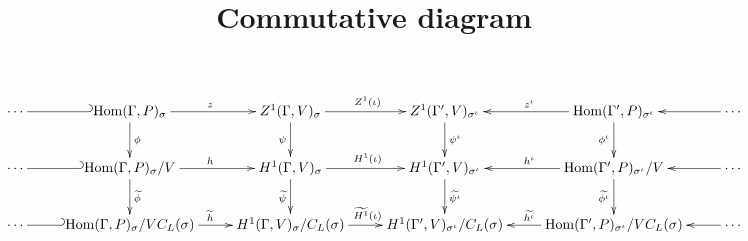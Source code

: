 \documentclass[12pt, a4paper]{amsart}
\newcommand{\Hom}[3]{\mathrm{Hom}(#1, #2)_{#3}}
\begin{document}
\title{Commutative diagram}
\maketitle
\begin{displaymath}
\xymatrix{
\cdots & \ar@{_{(}-}[l] \Hom{\Gamma}{P}{\sigma} \ar[d]^{\phi} \ar[r]^z & Z^1(\Gamma, V)_\sigma \ar[d]_{\psi} \ar[r]^{Z^1(\iota)} & Z^1(\Gamma', V)_{\sigma^\iota} \ar[d]^{\psi^\iota} & \Hom{\Gamma'}{P}{\sigma^\iota} \ar[l]_{z^\iota} \ar[d]_{\phi^\iota} & \cdots \ar@{->}[l] \\
\cdots & \ar@{_{(}-}[l] \Hom{\Gamma}{P}{\sigma}/V \ar[d]^{\widetilde{\phi}} \ar[r]^h & H^1(\Gamma, V)_\sigma \ar[d]_{\widetilde{\psi}} \ar[r]^{H^1(\iota)} & H^1(\Gamma', V)_{\sigma^\iota} \ar[d]^{\widetilde{\psi^\iota}} & \Hom{\Gamma'}{P}{\sigma^\iota}/V \ar[l]_{h^\iota} \ar[d]_{\widetilde{\phi^\iota}} & \cdots \ar@{->}[l] \\
\cdots & \ar@{_{(}-}[l] \Hom{\Gamma}{P}{\sigma}/VC_L(\sigma) \ar[r]^{\widetilde{h}} & H^1(\Gamma, V)_\sigma/C_L(\sigma) \ar[r]^{\widetilde{H^1}(\iota)} & H^1(\Gamma', V)_{\sigma^\iota}/C_L(\sigma) & \Hom{\Gamma'}{P}{\sigma^\iota}/VC_L(\sigma) \ar[l]_{\widetilde{h^\iota}} & \cdots \ar@{->}[l] \\
}
\end{displaymath}
\end{document}
